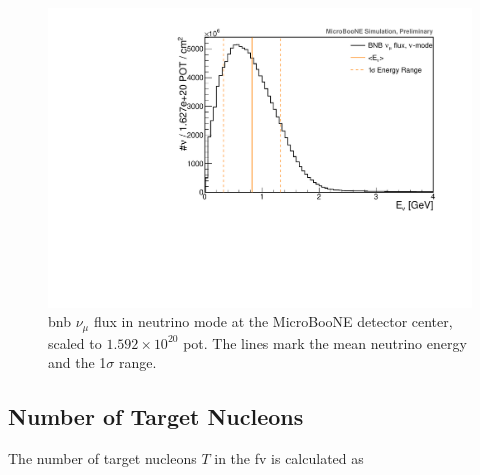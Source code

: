 \begin{figure}[]
\centering
\includegraphics[width=.70\textwidth]{images/flux_energy_range}
\caption[\acrshort{bnb} $\nu_\mu$ Flux at MicroBooNE]{\acrshort{bnb} $\nu_\mu$ flux in neutrino mode at the MicroBooNE detector center, scaled to $1.592 \times 10^{20}$ \acrshort{pot}. The lines mark the mean neutrino energy and the 1$\sigma$ range.}
\label{fig:flux_energy_range}
\end{figure} 



\subsection{Number of Target Nucleons}

The number of target nucleons $T$ in the \acrshort{fv} is calculated as

